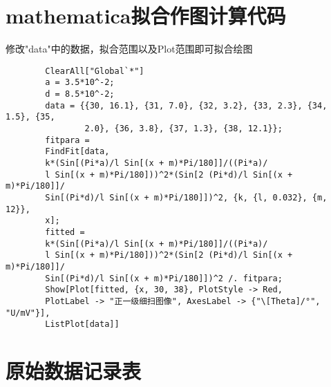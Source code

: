\documentclass[11pt]{article}
\begin{document}
	\newpage
	
	\appendix
	
	\section{mathematica拟合作图计算代码}
	修改"data"中的数据，拟合范围以及Plot范围即可拟合绘图
	\begin{lstlisting}
		ClearAll["Global`*"]
		a = 3.5*10^-2;
		d = 8.5*10^-2;
		data = {{30, 16.1}, {31, 7.0}, {32, 3.2}, {33, 2.3}, {34, 1.5}, {35, 
				2.0}, {36, 3.8}, {37, 1.3}, {38, 12.1}};
		fitpara = 
		FindFit[data, 
		k*(Sin[(Pi*a)/l Sin[(x + m)*Pi/180]]/((Pi*a)/
		l Sin[(x + m)*Pi/180]))^2*(Sin[2 (Pi*d)/l Sin[(x + m)*Pi/180]]/
		Sin[(Pi*d)/l Sin[(x + m)*Pi/180]])^2, {k, {l, 0.032}, {m, 12}}, 
		x];
		fitted = 
		k*(Sin[(Pi*a)/l Sin[(x + m)*Pi/180]]/((Pi*a)/
		l Sin[(x + m)*Pi/180]))^2*(Sin[2 (Pi*d)/l Sin[(x + m)*Pi/180]]/
		Sin[(Pi*d)/l Sin[(x + m)*Pi/180]])^2 /. fitpara;
		Show[Plot[fitted, {x, 30, 38}, PlotStyle -> Red, 
		PlotLabel -> "正一级细扫图像", AxesLabel -> {"\[Theta]/°", "U/mV"}], 
		ListPlot[data]]
	\end{lstlisting}
	
	\section{原始数据记录表}
	
\end{document}
